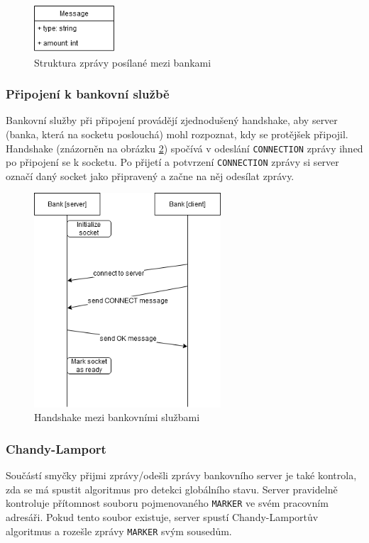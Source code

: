 \documentclass[11pt,a4paper]{scrartcl}
\begin{document}
	\begin{figure}[H]
		\centering
		\includegraphics[width=3cm]{img/message.png}
		\caption{Struktura zprávy posílané mezi bankami}
		\label{fig:message}
	\end{figure}
	
	\subsubsection{Připojení k bankovní službě}
	Bankovní služby při připojení provádějí zjednodušený handshake,	aby server (banka, která na socketu poslouchá) mohl rozpoznat, kdy se protějšek připojil. Handshake (znázorněn na obrázku \ref{fig:handshake}) spočívá v odeslání \verb|CONNECTION| zprávy ihned po připojení se k socketu. Po přijetí a potvrzení \verb|CONNECTION| zprávy si server označí daný socket jako připravený a začne na něj odesílat zprávy.

	\begin{figure}[H]
		\centering
		\includegraphics[height=8cm]{img/bank-handshake.png}
		\caption{Handshake mezi bankovními službami}
		\label{fig:handshake}
	\end{figure}
	
	\subsubsection{Chandy-Lamport}
	Součástí smyčky přijmi zprávy/odešli zprávy bankovního server je také kontrola, zda se má spustit algoritmus pro detekci globálního stavu. Server pravidelně kontroluje přítomnost souboru pojmenovaného \verb|MARKER| ve svém pracovním adresáři. Pokud tento soubor existuje, server spustí Chandy-Lamportův algoritmus a rozešle zprávy \verb|MARKER| svým sousedům.
	
\end{document}
